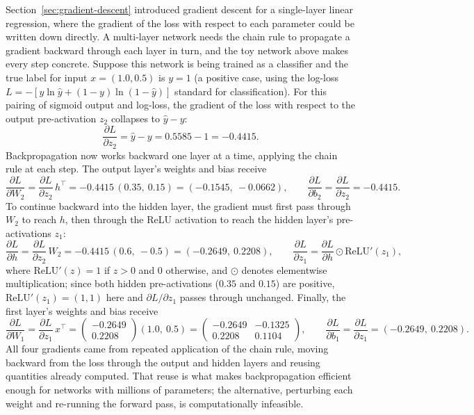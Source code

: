 \documentclass[../ai_in_finance]{subfiles}
\begin{document}
Section~\ref{sec:gradient-descent} introduced gradient descent for a single-layer linear regression, where the gradient of the loss with respect to each parameter could be written down directly. A multi-layer network needs the chain rule to propagate a gradient backward through each layer in turn, and the toy network above makes every step concrete. Suppose this network is being trained as a classifier and the true label for input $x=(1.0,0.5)$ is $y=1$ (a positive case, using the log-loss $L=-[y\ln\hat y+(1-y)\ln(1-\hat y)]$ standard for classification). For this pairing of sigmoid output and log-loss, the gradient of the loss with respect to the output pre-activation $z_2$ collapses to $\hat y - y$:
\begin{equation*}
\frac{\partial L}{\partial z_2} = \hat y - y = 0.5585 - 1 = -0.4415.
\end{equation*}
Backpropagation now works backward one layer at a time, applying the chain rule at each step. The output layer's weights and bias receive
\begin{equation*}
\frac{\partial L}{\partial W_2} = \frac{\partial L}{\partial z_2}\, h^\top = -0.4415\,(0.35,\ 0.15) = (-0.1545,\ -0.0662), \qquad \frac{\partial L}{\partial b_2} = \frac{\partial L}{\partial z_2} = -0.4415.
\end{equation*}
To continue backward into the hidden layer, the gradient must first pass through $W_2$ to reach $h$, then through the ReLU activation to reach the hidden layer's pre-activations $z_1$:
\begin{equation*}
\frac{\partial L}{\partial h} = \frac{\partial L}{\partial z_2}\,W_2 = -0.4415\,(0.6,\ -0.5) = (-0.2649,\ 0.2208), \qquad \frac{\partial L}{\partial z_1} = \frac{\partial L}{\partial h} \odot \text{ReLU}'(z_1),
\end{equation*}
where $\text{ReLU}'(z)=1$ if $z>0$ and $0$ otherwise, and $\odot$ denotes elementwise multiplication; since both hidden pre-activations ($0.35$ and $0.15$) are positive, $\text{ReLU}'(z_1)=(1,1)$ here and $\partial L/\partial z_1$ passes through unchanged. Finally, the first layer's weights and bias receive
\begin{equation*}
\frac{\partial L}{\partial W_1} = \frac{\partial L}{\partial z_1}\,x^\top = \begin{pmatrix} -0.2649 \\ 0.2208 \end{pmatrix}(1.0,\ 0.5) = \begin{pmatrix} -0.2649 & -0.1325 \\ 0.2208 & 0.1104 \end{pmatrix}, \qquad \frac{\partial L}{\partial b_1} = \frac{\partial L}{\partial z_1} = (-0.2649,\ 0.2208).
\end{equation*}
All four gradients came from repeated application of the chain rule, moving backward from the loss through the output and hidden layers and reusing quantities already computed. That reuse is what makes backpropagation efficient enough for networks with millions of parameters; the alternative, perturbing each weight and re-running the forward pass, is computationally infeasible.
\end{document}
